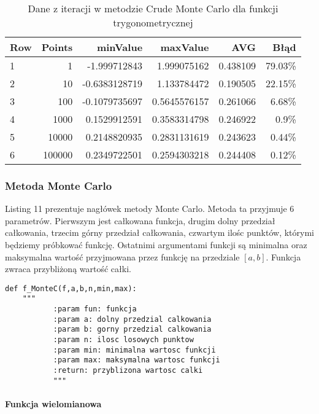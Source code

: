 \documentclass[12pt,twoside]{article}
\begin{document}
\begin{table}[H]
\centering 
\caption{Dane z iteracji w metodzie Crude Monte Carlo dla funkcji trygonometrycznej}
\label{tabela6.2}
\begin{tabular}{lrrrrr}
\toprule
{Row} &  Points &  minValue &  maxValue &       AVG &      Błąd \\
\midrule
1  &     1 & -1.999712843 &   1.999075162 & 0.438109 & 79.03\% \\
2  &     10 & -0.6383128719 &  1.133784472 & 0.190505 & 22.15\% \\
3  &     100 & -0.1079735697 &  0.5645576157 & 0.261066 & 6.68\% \\
4  &     1000 & 0.1529912591 &   0.3583314798 & 0.246922 & 0.9\% \\
5  &     10000 & 0.2148820935 &  0.2831131619 & 0.243623 & 0.44\% \\
6  &     100000 & 0.2349722501 &  0.2594303218 & 0.244408 & 0.12\% \\
\bottomrule
\end{tabular}
\end{table}


\subsubsection{Metoda Monte Carlo}
Listing 11 prezentuje nagłówek metody Monte Carlo. Metoda ta przyjmuje 6 parametrów. Pierwszym jest całkowana funkcja, drugim dolny przedział całkowania, trzecim górny przedział całkowania, czwartym ilośc punktów, którymi będziemy próbkować funkcję. Ostatnimi argumentami funkcji są minimalna oraz maksymalna wartość przyjmowana przez funkcję na przedziale $[a,b]$. Funkcja zwraca przybliżoną wartość całki.

\begin{lstlisting}[caption={Kod w języku python implementujący metodę Monte Carlo}]
    def f_MonteC(f,a,b,n,min,max):
    """
           :param fun: funkcja
           :param a: dolny przedzial calkowania
           :param b: gorny przedzial calkowania
           :param n: ilosc losowych punktow
           :param min: minimalna wartosc funkcji
           :param max: maksymalna wartosc funkcji
           :return: przyblizona wartosc calki
           """
\end{lstlisting}
\label{Listing 11}

\paragraph{Funkcja wielomianowa}\mbox{} \\
\end{document}
